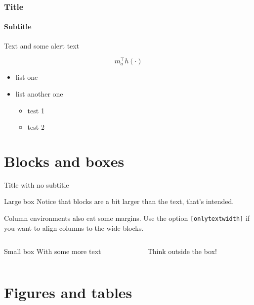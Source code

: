 \documentclass[11pt,aspectratio=169]{beamer}
\begin{document}
\begin{frame}

	\frametitle{Title}
	\framesubtitle{Subtitle}
	
	Text and some \alert{alert text}
	
	\[
	m_a^\top h(\cdot)
	\]
	
	
	\begin{itemize}
	\item list one
	\item list another one
		\begin{itemize}
		\item test 1
		\item test 2
		\end{itemize}
	\end{itemize}

\end{frame}

\section{Blocks and boxes}

\begin{frame}{Title with no subtitle}

	\begin{block}{Large box}
	Notice that blocks are a bit larger than the text, that's intended.
	\end{block}
	
	Column environments also eat some margins. Use the option \texttt{[onlytextwidth]} if you want to align columns to the wide blocks.
	
	\begin{columns}[onlytextwidth]
	\begin{column}{0.45\textwidth}
		\begin{block}{Small box}
		With some more text
		\end{block}
	\end{column}
	\begin{column}{0.5\textwidth}
		Think outside the box!
	\end{column}
	\end{columns}

\end{frame}

\section{Figures and tables}
\end{document}
